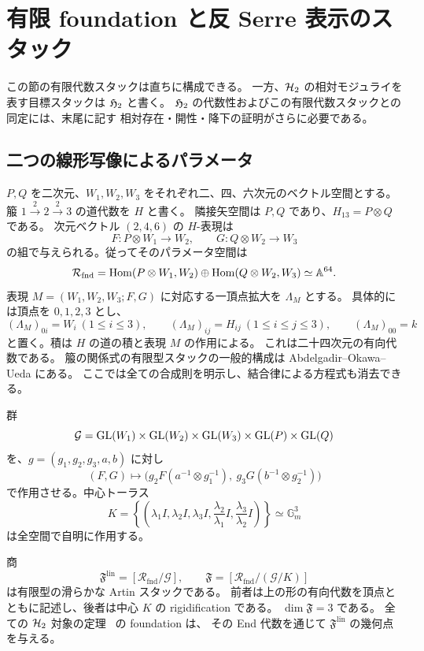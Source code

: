 \section{有限 foundation と反 Serre 表示のスタック}
\label{sec:foundation-stack}

この節の有限代数スタックは直ちに構成できる。
一方、$\mathcal H_2$ の相対モジュライを表す目標スタックは $\mathfrak H_2$ と書く。
$\mathfrak H_2$ の代数性およびこの有限代数スタックとの同定には、末尾に記す
相対存在・開性・降下の証明がさらに必要である。

\subsection{二つの線形写像によるパラメータ}

$P,Q$ を二次元、$W_1,W_2,W_3$ をそれぞれ二、四、六次元のベクトル空間とする。
箙 $1\overset{2}{\longrightarrow}2\overset{2}{\longrightarrow}3$ の道代数を $H$ と書く。
隣接矢空間は $P,Q$ であり、$H_{13}=P\otimes Q$ である。
次元ベクトル $(2,4,6)$ の $H$-表現は
\[
 F:P\otimes W_1\longrightarrow W_2,\qquad
 G:Q\otimes W_2\longrightarrow W_3
\]
の組で与えられる。従ってそのパラメータ空間は
\[
 \mathcal R_{\mathrm{fnd}}
 =\operatorname{Hom}(P\otimes W_1,W_2)\oplus\operatorname{Hom}(Q\otimes W_2,W_3)
 \simeq\mathbb A^{64}.
\]
表現 $M=(W_1,W_2,W_3;F,G)$ に対応する一頂点拡大を $\Lambda_M$ とする。
具体的には頂点を $0,1,2,3$ とし、
\[
 (\Lambda_M)_{0i}=W_i\ (1\le i\le3),\qquad
 (\Lambda_M)_{ij}=H_{ij}\ (1\le i\le j\le3),\qquad
 (\Lambda_M)_{00}=k
\]
と置く。積は $H$ の道の積と表現 $M$ の作用による。
これは二十四次元の有向代数である。
箙の関係式の有限型スタックの一般的構成は
Abdelgadir--Okawa--Ueda \cite[Definition 3.5, Proposition 3.6]{AOU2014} にある。
ここでは全ての合成則を明示し、結合律による方程式も消去できる。

群
\[
 \mathcal G=\operatorname{GL}(W_1)\times\operatorname{GL}(W_2)\times\operatorname{GL}(W_3)
             \times\operatorname{GL}(P)\times\operatorname{GL}(Q)
\]
を、$g=(g_1,g_2,g_3,a,b)$ に対し
\[
 (F,G)\longmapsto
 \bigl(g_2F(a^{-1}\otimes g_1^{-1}),\
       g_3G(b^{-1}\otimes g_2^{-1})\bigr)
\]
で作用させる。中心トーラス
\[
 K=\left\{
 \left(\lambda_1 I,\lambda_2 I,\lambda_3 I,
       \frac{\lambda_2}{\lambda_1}I,
       \frac{\lambda_3}{\lambda_2}I\right)
 \right\}\simeq\mathbb G_m^3
\]
は全空間で自明に作用する。

\begin{proposition}
\label{prop:foundation-stack}
商
\[
 \mathfrak F^{\mathrm{lin}}=[\mathcal R_{\mathrm{fnd}}/\mathcal G],\qquad
 \mathfrak F=[\mathcal R_{\mathrm{fnd}}/(\mathcal G/K)]
\]
は有限型の滑らかな Artin スタックである。
前者は上の形の有向代数を頂点とともに記述し、後者は中心 $K$ の rigidification である。
$\dim\mathfrak F=3$ である。
全ての $\mathcal H_2$ 対象の定理~\cite[\texttt{thm:normal-helix}]{QuadricIntrinsic2026} の foundation は、
その End 代数を通じて $\mathfrak F^{\mathrm{lin}}$ の幾何点を与える。
\end{proposition}

